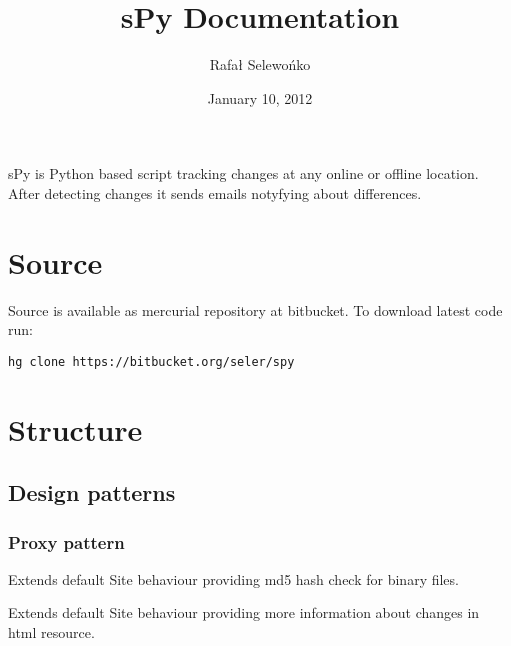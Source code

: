 \documentclass[letterpaper,10pt,english]{sphinxmanual}
\title{sPy Documentation}
\date{January 10, 2012}
\author{Rafał Selewońko}
\begin{document}
\maketitle
\tableofcontents
{}\label{index::doc}


sPy is Python based script tracking changes at any online or offline location.
After detecting changes it sends emails notyfying about differences.


\chapter{Source}
\label{index:welcome-to-spy-s-documentation}\label{index:source}
Source is available as mercurial repository at bitbucket. To download latest code run:

\begin{Verbatim}[commandchars=\\\{\}]
hg clone https://bitbucket.org/seler/spy
\end{Verbatim}


\chapter{Structure}
\label{index:structure}

\section{Design patterns}
\label{index:design-patterns}

\subsection{Proxy pattern}
\label{index:proxy-pattern}

\begin{fulllineitems}
\label{index:spy.BinarySite}
Extends default Site behaviour providing md5 hash check for binary files.

\end{fulllineitems}


\begin{fulllineitems}
\label{index:spy.HTMLSite}
Extends default Site behaviour providing more information
about changes in html resource.

\end{fulllineitems}
\end{document}
